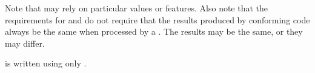 %
%
%
%
%
%  
%
%
%


Note that  may rely on particular
 values or features. Also note that the
requirements for  and  do not
require that the results produced by conforming code always be the
same when processed by a . The results may be the
same, or they may differ.
 
 is written using only .

